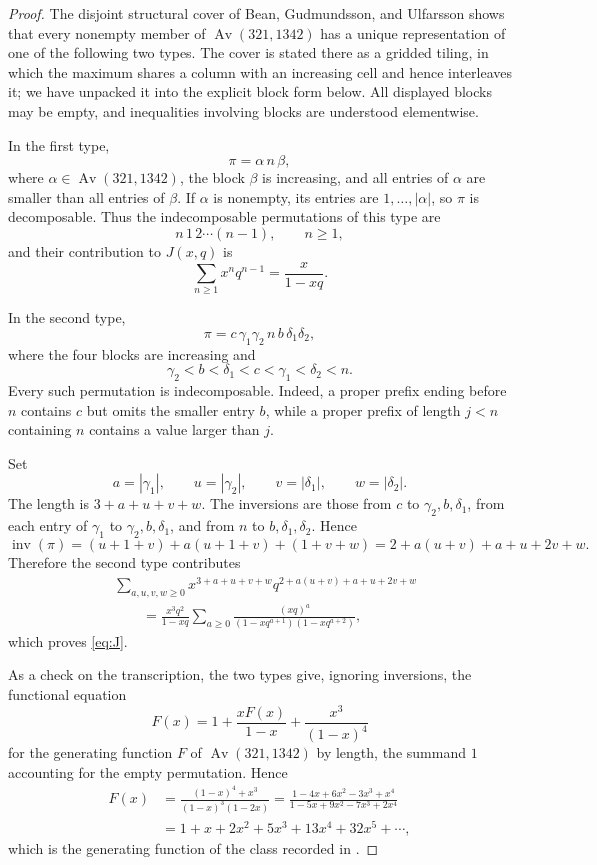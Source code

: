 \documentclass[11pt]{amsart}
\newcommand{\Av}{\operatorname{Av}}
\newcommand{\inv}{\operatorname{inv}}
\begin{document}
\begin{proof}
The disjoint structural cover of Bean, Gudmundsson, and Ulfarsson
\cite[Proposition~7 and Equation~(6)]{BeanGudmundssonUlfarsson2019}
shows that every nonempty member of $\Av(321,1342)$ has a unique
representation of one of the following two types. The cover is stated
there as a gridded tiling, in which the maximum shares a column with an
increasing cell and hence interleaves it; we have unpacked it into the
explicit block form below. All displayed blocks may be empty, and
inequalities involving blocks are understood elementwise.

In the first type,
\[
\pi=\alpha\,n\,\beta,
\]
where $\alpha\in\Av(321,1342)$, the block $\beta$ is increasing, and
all entries of $\alpha$ are smaller than all entries of $\beta$. If
$\alpha$ is nonempty, its entries are $1,\ldots,|\alpha|$, so $\pi$ is
decomposable. Thus the indecomposable permutations of this type are
\[
n\,1\,2\cdots(n-1),\qquad n\ge1,
\]
and their contribution to $J(x,q)$ is
\[
\sum_{n\ge1}x^nq^{n-1}
=
\frac{x}{1-xq}.
\]

In the second type,
\[
\pi=c\,\gamma_1\gamma_2\,n\,b\,\delta_1\delta_2,
\]
where the four blocks are increasing and
\[
\gamma_2<b<\delta_1<c<\gamma_1<\delta_2<n.
\]
Every such permutation is indecomposable. Indeed, a proper prefix
ending before $n$ contains $c$ but omits the smaller entry $b$, while a
proper prefix of length $j<n$ containing $n$ contains a value larger
than $j$.

Set
\[
a=|\gamma_1|,
\qquad
u=|\gamma_2|,
\qquad
v=|\delta_1|,
\qquad
w=|\delta_2|.
\]
The length is $3+a+u+v+w$. The inversions are those from $c$ to
$\gamma_2,b,\delta_1$, from each entry of $\gamma_1$ to
$\gamma_2,b,\delta_1$, and from $n$ to $b,\delta_1,\delta_2$. Hence
\[
\inv(\pi)
=
(u+1+v)+a(u+1+v)+(1+v+w)
=
2+a(u+v)+a+u+2v+w.
\]
Therefore the second type contributes
\begin{align*}
&\sum_{a,u,v,w\ge0}
x^{3+a+u+v+w}
q^{2+a(u+v)+a+u+2v+w}
\\
&\qquad=
\frac{x^3q^2}{1-xq}
\sum_{a\ge0}
\frac{(xq)^a}
     {(1-xq^{a+1})(1-xq^{a+2})},
\end{align*}
which proves \eqref{eq:J}.

As a check on the transcription, the two types give, ignoring
inversions, the functional equation
\[
F(x)
=
1
+
\frac{xF(x)}{1-x}
+
\frac{x^3}{(1-x)^4}
\]
for the generating function $F$ of $\Av(321,1342)$ by length, the
summand $1$ accounting for the empty permutation. Hence
\begin{align*}
F(x)
&=
\frac{(1-x)^4+x^3}{(1-x)^3(1-2x)}
=
\frac{1-4x+6x^2-3x^3+x^4}{1-5x+9x^2-7x^3+2x^4}
\\
&=
1+x+2x^2+5x^3+13x^4+32x^5+\cdots,
\end{align*}
which is the generating function of the class recorded in
\cite{BeanGudmundssonUlfarsson2019}.


\end{proof}
\end{document}

